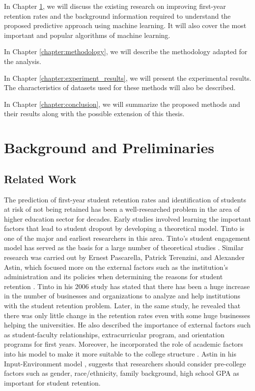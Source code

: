 \documentclass[11pt,openright]{report}
\begin{document}
\noindent In Chapter \ref{chapter:background}, we will discuss the existing research on improving first-year retention rates and the background information required to understand the proposed predictive approach using machine learning. It will also cover the most important and popular algorithms of machine learning.
\newline

\noindent In Chapter \ref{chapter:methodology}, we will describe the methodology adapted for the analysis. 
\newline

\noindent In Chapter \ref{chapter:experiment_results}, we will present the experimental results. The characteristics of datasets used for these methods will also be described.
\newline

\noindent In Chapter \ref{chapter:conclusion}, we will summarize the proposed methods and their results along with the possible extension of this thesis.

\chapter{Background and Preliminaries} \label{chapter:background}
\section{Related Work}\label{section:relatedwork}

The prediction of first-year student retention rates and identification of students at risk of not being retained has been a well-researched problem in the area of higher education sector for decades. Early studies involved learning the important factors that lead to student dropout by developing a theoretical model. Tinto is one of the major and earliest researchers in this area. Tinto's student engagement model \cite{tinto1999taking} has served as the basis for a large number of theoretical studies \cite{braxton2002introduction}. Similar research was carried out by Ernest Pascarella, Patrick Terenzini, and Alexander Astin, which focused more on the external factors such as the institution's administration and its policies when determining the reasons for student retention \cite{astin2012assessment}. Tinto in his 2006 study \cite{tinto2006} has stated that there has been a huge increase in the number of businesses and organizations to analyze and help institutions with the student retention problem. Later, in the same study, he revealed that there was only little change in the retention rates even with some huge businesses helping the universities. He also described the importance of external factors such as student-faculty relationships, extracurricular program, and orientation programs for first years. Moreover, he incorporated the role of academic factors into his model to make it more suitable to the college structure \cite{tinto2006}. Astin in his Input-Environment model \cite{astin2012assessment}, suggests that researchers should consider pre-college factors such as gender, race/ethnicity, family background, high school GPA  as important for student retention.
\end{document}
